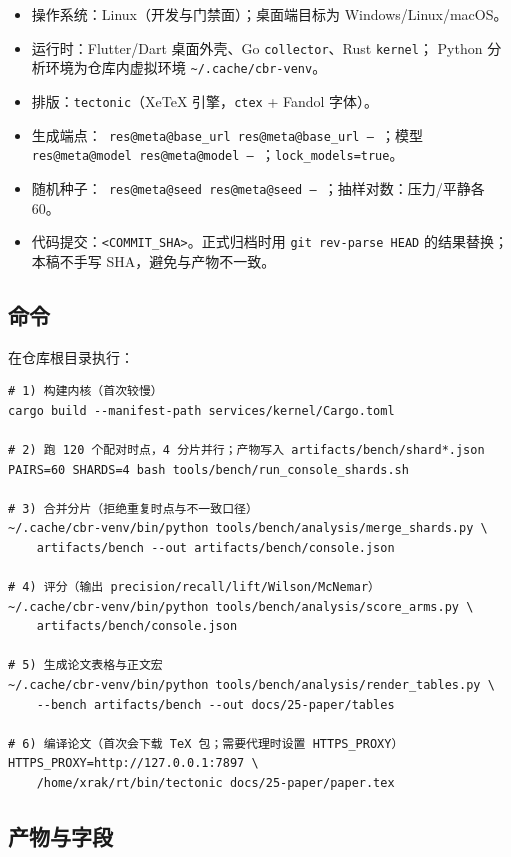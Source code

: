 \documentclass[UTF8,fontset=fandol,11pt,a4paper]{ctexart}
\makeatletter
\newcommand{\RESULT}[2]{%
  \ifcsname res@#1@#2\endcsname
    \csname res@#1@#2\endcsname
  \else
    --%
  \fi}
\makeatother
\begin{document}
\begin{itemize}
  \item 操作系统：Linux（开发与门禁面）；桌面端目标为 Windows/Linux/macOS。
  \item 运行时：Flutter/Dart 桌面外壳、Go \texttt{collector}、Rust \texttt{kernel}；
        Python 分析环境为仓库内虚拟环境 \verb|~/.cache/cbr-venv|。
  \item 排版：\texttt{tectonic}（XeTeX 引擎，\texttt{ctex} + Fandol 字体）。
  \item 生成端点：\texttt{\RESULT{meta}{base_url}}；模型
        \texttt{\RESULT{meta}{model}}；\texttt{lock\_models=true}。
  \item 随机种子：\texttt{\RESULT{meta}{seed}}；抽样对数：压力/平静各 60。
  \item 代码提交：\texttt{<COMMIT\_SHA>}。正式归档时用
        \texttt{git rev-parse HEAD} 的结果替换；本稿不手写 SHA，避免与产物不一致。
\end{itemize}

\subsection{命令}

在仓库根目录执行：
\begin{verbatim}
# 1) 构建内核（首次较慢）
cargo build --manifest-path services/kernel/Cargo.toml

# 2) 跑 120 个配对时点，4 分片并行；产物写入 artifacts/bench/shard*.json
PAIRS=60 SHARDS=4 bash tools/bench/run_console_shards.sh

# 3) 合并分片（拒绝重复时点与不一致口径）
~/.cache/cbr-venv/bin/python tools/bench/analysis/merge_shards.py \
    artifacts/bench --out artifacts/bench/console.json

# 4) 评分（输出 precision/recall/lift/Wilson/McNemar）
~/.cache/cbr-venv/bin/python tools/bench/analysis/score_arms.py \
    artifacts/bench/console.json

# 5) 生成论文表格与正文宏
~/.cache/cbr-venv/bin/python tools/bench/analysis/render_tables.py \
    --bench artifacts/bench --out docs/25-paper/tables

# 6) 编译论文（首次会下载 TeX 包；需要代理时设置 HTTPS_PROXY）
HTTPS_PROXY=http://127.0.0.1:7897 \
    /home/xrak/rt/bin/tectonic docs/25-paper/paper.tex
\end{verbatim}

\subsection{产物与字段}
\end{document}
